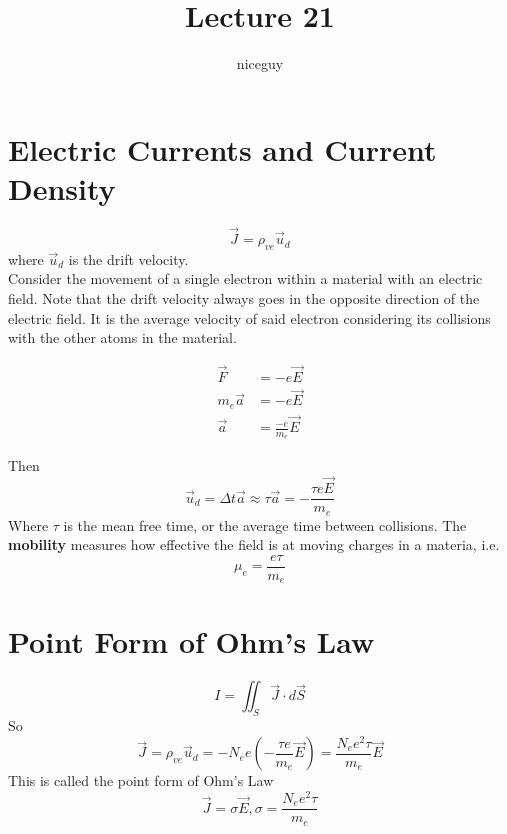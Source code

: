 \documentclass[12pt]{article}
\author{niceguy}
\title{Lecture 21}
\begin{document}
\maketitle

\section{Electric Currents and Current Density}

$$\vec{J} = \rho_{ve}\vec{u}_d$$
where $\vec{u}_d$ is the drift velocity. \\
Consider the movement of a single electron within a material with an electric field. Note that the drift velocity always goes in the opposite direction of the electric field. It is the average velocity of said electron considering its collisions with the other atoms in the material.

\begin{align*}
	\vec{F} &= -e\vec{E} \\
	m_e\vec{a} &= -e\vec{E} \\
	\vec{a} &= \frac{-e}{m_e}\vec{E}
\end{align*}

Then
$$\vec{u}_d = \Delta t\vec{a} \approx \tau\vec{a} = -\frac{\tau e\vec{E}}{m_e}$$
Where $\tau$ is the mean free time, or the average time between collisions. The \textbf{mobility} measures how effective the field is at moving charges in a materia, i.e.
$$\mu_e = \frac{e\tau}{m_e}$$

\section{Point Form of Ohm's Law}

$$I = \iint_S \vec{J} \cdot d\vec{S}$$
So
$$\vec{J} = \rho_{ve}\vec{u}_d = -N_ee\left(-\frac{\tau e}{m_e}\vec{E}\right) = \frac{N_ee^2\tau}{m_e}\vec{E}$$
This is called the point form of Ohm's Law
$$\vec{J} = \sigma\vec{E}, \sigma = \frac{N_ee^2\tau}{m_e}$$
\end{document}

